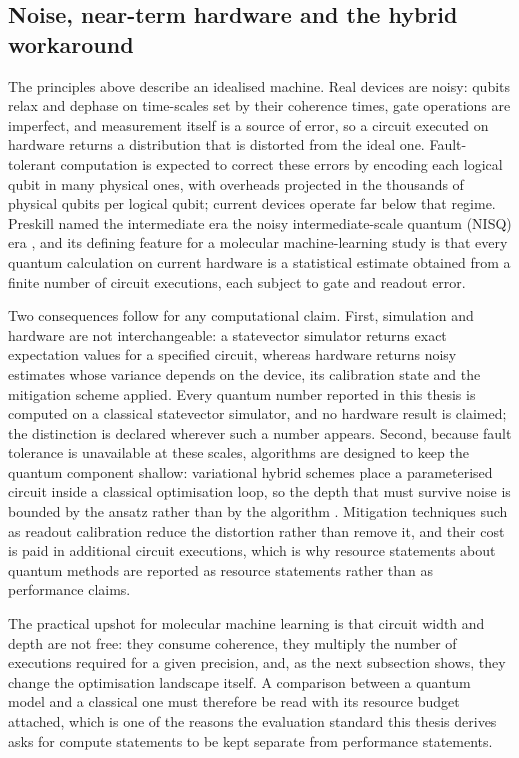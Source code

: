 \subsection{Noise, near-term hardware and the hybrid workaround}

The principles above describe an idealised machine. Real devices are noisy: qubits relax and dephase on time-scales set by their coherence times, gate operations are imperfect, and measurement itself is a source of error, so a circuit executed on hardware returns a distribution that is distorted from the ideal one. Fault-tolerant computation is expected to correct these errors by encoding each logical qubit in many physical ones, with overheads projected in the thousands of physical qubits per logical qubit; current devices operate far below that regime. Preskill named the intermediate era the noisy intermediate-scale quantum (NISQ) era \cite{Preskill2018}, and its defining feature for a molecular machine-learning study is that every quantum calculation on current hardware is a statistical estimate obtained from a finite number of circuit executions, each subject to gate and readout error.

Two consequences follow for any computational claim. First, simulation and hardware are not interchangeable: a statevector simulator returns exact expectation values for a specified circuit, whereas hardware returns noisy estimates whose variance depends on the device, its calibration state and the mitigation scheme applied. Every quantum number reported in this thesis is computed on a classical statevector simulator, and no hardware result is claimed; the distinction is declared wherever such a number appears. Second, because fault tolerance is unavailable at these scales, algorithms are designed to keep the quantum component shallow: variational hybrid schemes place a parameterised circuit inside a classical optimisation loop, so the depth that must survive noise is bounded by the ansatz rather than by the algorithm \cite{Cerezo2020,PerdomoOrtiz2017}. Mitigation techniques such as readout calibration reduce the distortion rather than remove it, and their cost is paid in additional circuit executions, which is why resource statements about quantum methods are reported as resource statements rather than as performance claims.

The practical upshot for molecular machine learning is that circuit width and depth are not free: they consume coherence, they multiply the number of executions required for a given precision, and, as the next subsection shows, they change the optimisation landscape itself. A comparison between a quantum model and a classical one must therefore be read with its resource budget attached, which is one of the reasons the evaluation standard this thesis derives asks for compute statements to be kept separate from performance statements.


